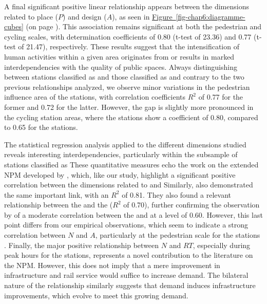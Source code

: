 \begin{refsegment}
A final significant positive linear relationship appears between the dimensions related to place (\(P\)) and design (\(A\)), as seen in \hyperref[fig-chap6:diagramme-cubes]{Figure~\ref{fig-chap6:diagramme-cubes}} (on page \pageref{fig-chap6:diagramme-cubes}). This association remains significant at both the pedestrian and cycling scales, with determination coefficients of 0.80 (t-test of 23.36) and 0.77 (t-test of 21.47), respectively. These results suggest that the intensification of human activities within a given area originates from or results in marked interdependencies with the quality of public spaces. Always distinguishing between stations classified as  and those classified as  and contrary to the two previous relationships analyzed, we observe minor variations in the pedestrian influence area of the stations, with correlation coefficients \(R^2\) of 0.77 for the former and 0.72 for the latter. However, the gap is slightly more pronounced in the cycling station areas, where the  stations show a coefficient of 0.80, compared to 0.65 for the  stations.%

The statistical regression analysis applied to the different dimensions studied reveals interesting interdependencies, particularly within the subsample of stations classified as  These quantitative measures echo the work on the extended \acrshort{NPM} developed by \textcolor{blue}{\textcite[289]{vale_extended_2018}}, which, like our study, highlight a significant positive correlation between the dimensions related to  and  Similarly, \textcolor{blue}{\textcite[10]{zhang_network_2019}} also demonstrated the same important link, with an \(R^2\) of 0.81. They also found a relevant relationship between the  and the  (\(R^2\) of 0.70), further confirming the observation by \textcolor{blue}{\textcite[289]{vale_extended_2018}} of a moderate correlation between the  and  at a level of 0.60. However, this last point differs from our empirical observations, which seem to indicate a strong correlation between \(N\) and \(A\), particularly at the pedestrian scale for the  stations \textcolor{blue}{\autocite[79]{papa_accessibility_2015}}. Finally, the major positive relationship between \(N\) and \(RT\), especially during peak hours for the  stations, represents a novel contribution to the literature on the \acrshort{NPM}. However, this does not imply that a mere improvement in infrastructure and rail service would suffice to increase demand. The bilateral nature of the relationship similarly suggests that demand induces infrastructure improvements, which evolve to meet this growing demand.%


\end{refsegment}
